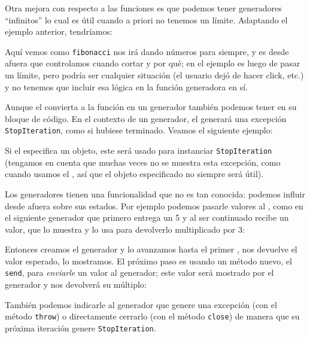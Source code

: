 
Otra mejora con respecto a las funciones es que podemos tener generadores ``infinitos'' lo cual es útil cuando a priori no tenemos un límite. Adaptando el ejemplo anterior, tendríamos:


Aquí vemos como \texttt{fibonacci} nos irá dando números para siempre, y es desde afuera que controlamos cuando cortar y por qué; en el ejemplo es luego de pasar un límite, pero podría ser cualquier situación (el usuario dejó de hacer click, etc.) y no tenemos que incluir esa lógica en la función generadora en sí.

Aunque el  convierta a la función en un generador también podemos tener  en su bloque de código. En el contexto de un generador, el  generará una excepción \texttt{StopIteration}, como si hubiese terminado. Veamos el siguiente ejemplo:


Si el  especifica un objeto, este será usado para instanciar \texttt{StopIteration} (tengamos en cuenta que muchas veces no se muestra esta excepción, como cuando usamos el , así que el objeto especificado no siempre será útil).

Los generadores tienen una funcionalidad que no es tan conocida: podemos influir desde afuera sobre sus estados. Por ejemplo podemos pasarle valores al , como en el siguiente generador que primero entrega un 5 y al ser continuado recibe un valor, que lo muestra y lo usa para devolverlo multiplicado por 3:


Entonces creamos el generador y lo avanzamos hasta el primer , nos devuelve el valor esperado, lo mostramos. El próximo paso es usando un método nuevo, el \texttt{send}, para \textit{enviarle} un valor al generador; este valor será mostrado por el generador y nos devolverá su múltiplo:


También podemos indicarle al generador que genere una excepción (con el método \texttt{throw}) o directamente cerrarlo (con el método \texttt{close}) de manera que su próxima iteración genere \texttt{StopIteration}. 

